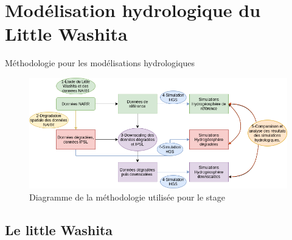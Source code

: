 \documentclass{beamer}
\numberwithin{equation}{section}
\begin{document}
	\section{Modélisation hydrologique du Little Washita}
	
	\begin{frame}{Méthodologie pour les modélisations hydrologiques}
			\begin{figure}
				\begin{center}
					\includegraphics[scale=0.4]{Diagrame_methodo.png}
				\end{center}
				\caption{Diagramme de la méthodologie utilisée pour le stage}
			\end{figure} 
	\end{frame}
	
	\subsection{Le little Washita}
	
\end{document}
